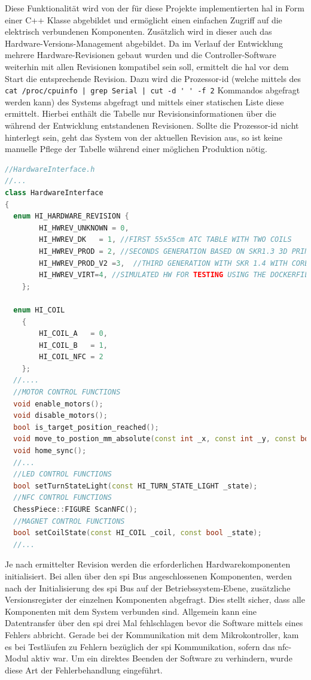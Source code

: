 Diese Funktionalität wird von der für diese Projekte implementierten
\gls{hal} in Form einer C++ Klasse abgebildet und ermöglicht einen
einfachen Zugriff auf die elektrisch verbundenen Komponenten. Zusätzlich
wird in dieser auch das Hardware-Versions-Management abgebildet. Da im
Verlauf der Entwicklung mehrere Hardware-Revisionen gebaut wurden und
die Controller-Software weiterhin mit allen Revisionen kompatibel sein
soll, ermittelt die \gls{hal} vor dem Start die entsprechende Revision.
Dazu wird die Prozessor-\gls{id} (welche mittels des
\passthrough{\lstinline!cat /proc/cpuinfo | grep Serial | cut -d ' ' -f 2!}
Kommandos abgefragt werden kann) des Systems abgefragt und mittels einer
statischen Liste diese ermittelt. Hierbei enthält die Tabelle nur
Revisionsinformationen über die während der Entwicklung entstandenen
Revisionen. Sollte die Prozessor-\gls{id} nicht hinterlegt sein, geht
das System von der aktuellen Revision aus, so ist keine manuelle Pflege
der Tabelle während einer möglichen Produktion nötig.

\begin{lstlisting}[language={C++}]
//HardwareInterface.h
//...
class HardwareInterface
{
  enum HI_HARDWARE_REVISION {
        HI_HWREV_UNKNOWN = 0,
        HI_HWREV_DK   = 1, //FIRST 55x55cm ATC TABLE WITH TWO COILS
        HI_HWREV_PROD = 2, //SECONDS GENERATION BASED ON SKR1.3 3D PRINT CONTROLLER
        HI_HWREV_PROD_V2 =3,  //THIRD GENERATION WITH SKR 1.4 WITH CORE XY MECHANIC
        HI_HWREV_VIRT=4, //SIMULATED HW FOR TESTING USING THE DOCKERFILE
    };

  enum HI_COIL
    {
        HI_COIL_A   = 0,
        HI_COIL_B   = 1,
        HI_COIL_NFC = 2
    };
  //....
  //MOTOR CONTROL FUNCTIONS
  void enable_motors();
  void disable_motors();
  bool is_target_position_reached();
  void move_to_postion_mm_absolute(const int _x, const int _y, const bool _blocking);
  void home_sync();
  //...
  //LED CONTROL FUNCTIONS
  bool setTurnStateLight(const HI_TURN_STATE_LIGHT _state);
  //NFC CONTROL FUNCTIONS
  ChessPiece::FIGURE ScanNFC();
  //MAGNET CONTROL FUNCTIONS
  bool setCoilState(const HI_COIL _coil, const bool _state);
  //...
\end{lstlisting}

Je nach ermittelter Revision werden die erforderlichen
Hardwarekomponenten initialisiert. Bei allen über den \gls{spi} Bus
angeschlossenen Komponenten, werden nach der Initialisierung des
\gls{spi} Bus auf der Betriebssystem-Ebene, zusätzliche Versionsregister
der einzelnen Komponenten abgefragt. Dies stellt sicher, dass alle
Komponenten mit dem System verbunden sind. Allgemein kann eine
Datentransfer über den \gls{spi} drei Mal fehlschlagen bevor die
Software mittels eines Fehlers abbricht. Gerade bei der Kommunikation
mit dem Mikrokontroller, kam es bei Testläufen zu Fehlern bezüglich der
\gls{spi} Kommunikation, sofern das \gls{nfc}-Modul aktiv war. Um ein
direktes Beenden der Software zu verhindern, wurde diese Art der
Fehlerbehandlung eingeführt.

